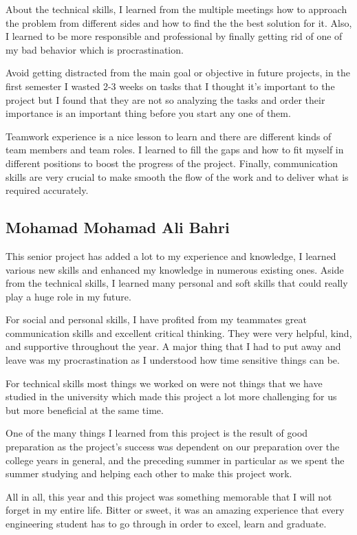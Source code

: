 \documentclass[../main.tex]{subfiles}
\begin{document}
About the technical skills, I learned from the multiple meetings how to 
approach the problem from different sides and how to find the 
the best solution for it. Also, I learned to be more responsible
and professional by finally getting rid of one of my bad behavior 
which is procrastination.

Avoid getting distracted from the main goal or objective in 
future projects, in the first semester I wasted 2-3 weeks 
on tasks that I thought it's important to the project but 
I found that they are not so analyzing the tasks and 
order their importance is an important thing before
you start any one of them.

Teamwork experience is a nice lesson to learn and 
there are different kinds of team members and team roles.
I learned to fill the gaps and how to fit myself in different 
positions to boost the progress of the project. 
Finally, communication skills are very crucial to make smooth 
the flow of the work and to deliver what is required accurately.

\subsection{Mohamad Mohamad Ali Bahri}
This senior project has added a lot to my experience and knowledge, I learned
various new skills and enhanced my knowledge in numerous existing ones. 
Aside from the technical skills, I learned many personal and soft skills that 
could really play a huge role in my future. 

For social and personal skills, I have profited from my teammates great 
communication skills and excellent critical thinking. They were very helpful, 
kind, and supportive throughout the year. A major thing that I had to put away
and leave was my procrastination as I understood how time sensitive things can
be. 

For technical skills most things we worked on were not things that we have 
studied in the university which made this project a lot more challenging for 
us but more beneficial at the same time. 

One of the many things I learned from this project is the result of good 
preparation as the project's success was dependent on our preparation over the 
college years in general, and the preceding summer in particular as we spent 
the summer studying and helping each other to make this project work.

All in all, this year and this project was something memorable that I will not 
forget in my entire life. Bitter or sweet, it was an amazing experience that 
every engineering student has to go through in order to excel, learn and 
graduate.
\end{document}
